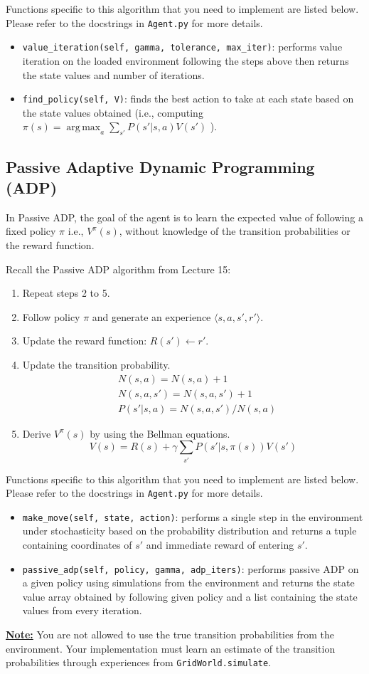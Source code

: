 \documentclass[12pt]{article}
\DeclareMathOperator*{\argmax}{arg\,max}
\begin{document}
Functions specific to this algorithm that you need to implement are listed below. Please refer to the docstrings in \texttt{Agent.py} for more details.
\begin{itemize}
    \item \texttt{value\_iteration(self, gamma, tolerance, max\_iter)}: performs value iteration on the loaded environment following the steps above then returns the state values and number of iterations.
    \item \texttt{find\_policy(self, V)}: finds the best action to take at each state based on the state values obtained (i.e., computing $\pi(s) = \argmax_a \sum_{s'} P(s'|s,a) V(s')$ ).
\end{itemize}


\subsection{Passive Adaptive Dynamic Programming (ADP)} \label{sec:passive_adp}

In Passive ADP, the goal of the agent is to learn the expected value of following a fixed policy $\pi$ i.e., $V^\pi(s)$, without knowledge of the transition probabilities or the reward function.

Recall the Passive ADP algorithm from Lecture 15:
\begin{enumerate}
    \item Repeat steps 2 to 5.
    \item Follow policy $\pi$ and generate an experience $\langle s, a, s', r' \rangle$.
    \item Update the reward function: $R(s') \leftarrow r'$.
    \item Update the transition probability.
    \begin{align*}
        &N(s,a) = N(s, a) + 1 \\
        &N(s,a, s') = N(s, a, s') + 1 \\
        &P(s'|s,a) = N(s,a,s') / N(s,a)
    \end{align*}
    \item Derive $V^\pi(s)$ by using the Bellman equations.
    $$V(s) = R(s) + \gamma \sum_{s'} P(s'|s, \pi(s)) V(s')$$
\end{enumerate}

Functions specific to this algorithm that you need to implement are listed below. Please refer to the docstrings in \texttt{Agent.py} for more details.

\begin{itemize}
    \item \texttt{make\_move(self, state, action)}: performs a single step in the environment under stochasticity based on the probability distribution and returns a tuple containing coordinates of $s'$ and immediate reward of entering $s'$.
    \item \texttt{passive\_adp(self, policy, gamma, adp\_iters)}: performs passive ADP on a given policy using simulations from the environment and returns the state value array obtained by following given policy and a list containing the state values from every iteration.
\end{itemize}

\underline{\textbf{Note:}} You are not allowed to use the true transition probabilities from the environment. Your implementation must learn an estimate of the transition probabilities through experiences from \texttt{GridWorld.simulate}.
\end{document}
